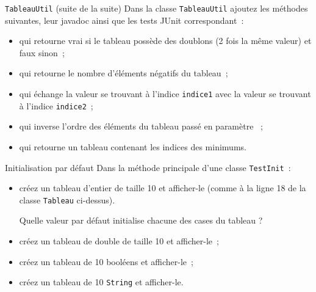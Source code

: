 \documentclass[a4paper,11pt]{article}
\begin{document}
	\begin{Exercice}{\texttt{TableauUtil} (suite de la suite)}	
		Dans la classe \texttt{TableauUtil} ajoutez les méthodes suivantes, leur
		 javadoc ainsi que les tests JUnit correspondant~:
		\begin{itemize}
			\item {} 
				qui retourne vrai si le tableau possède des doublons 
				(2 fois la même valeur) et faux sinon~;
			\item {} 
				qui retourne le nombre d'éléments négatifs du tableau~;
			\item {} 
				qui échange la valeur se trouvant à l'indice \texttt{indice1} 
				avec la valeur se trouvant à l'indice \texttt{indice2}~;
			\item {} 
				qui inverse l'ordre des éléments  du tableau passé en paramètre ~;				
			\item {} 
				qui retourne un tableau contenant les indices des minimums.
		\end{itemize}
	\end{Exercice}
	
		
	\begin{Exercice}{Initialisation par défaut}	
		Dans la méthode principale d'une classe \texttt{TestInit}~:
		\begin{itemize}
			\item créez un tableau d'entier de taille 10 et afficher-le 
				(comme à  la ligne 18 de la classe \texttt{Tableau} ci-dessus). 
				
				Quelle valeur par défaut initialise chacune des cases du tableau ?
			\item créez un tableau de double de taille 10 et afficher-le~;
			\item créez un tableau de 10 booléens et afficher-le~;
			\item créez un tableau de 10 \texttt{String} et afficher-le.
		\end{itemize}
	\end{Exercice}
\end{document}
